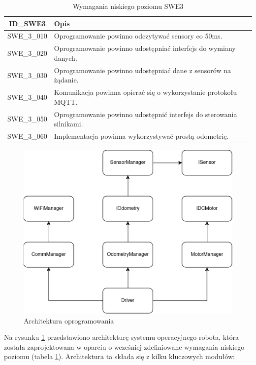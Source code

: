 \documentclass[12pt,twoside]{article}
\begin{document}
\begin{table}[ht]
\caption{Wymagania niskiego poziomu SWE3}
\centering		
	\begin{tabular}{|c|p{}|}	
		\hline
		ID\_SWE3 & Opis \\
		\hline
		SWE\_3\_010 & Oprogramowanie powinno odczytywać sensory co 50ms. \\
		\hline
		SWE\_3\_020 & Oprogramowanie powinno udostępniać interfejs do wymiany danych. \\
		\hline 
		SWE\_3\_030 & Oprogramowanie powinno udostępniać dane z sensorów na żądanie.\\
		\hline
		SWE\_3\_040 & Komunikacja powinna opierać się o wykorzystanie protokołu MQTT. \\
		\hline
		SWE\_3\_050 & Oprogramowanie powinno udostępnić interfejs do sterowania silnikami. \\
		\hline
		SWE\_3\_060 & Implementacja powinna wykorzystywać prostą odometrię. \\
				\hline
	\end{tabular}	
	
\label{Tab:SWE3}
\end{table}	

\newpage

\begin{figure}[ht]%
 \centering%
 \includegraphics[width=12cm]{figures/engSW/block.png}%
 \caption{Architektura oprogramowania}%
 \label{Fig:architektura}%
\end{figure}

Na rysunku \ref{Fig:architektura} przedstawiono architekturę systemu operacyjnego robota, która została zaprojektowana w oparciu o wcześniej zdefiniowane wymagania niskiego poziomu (tabela \ref{Tab:SWE3}). Architektura ta składa się z kilku kluczowych modułów:
\end{document}
